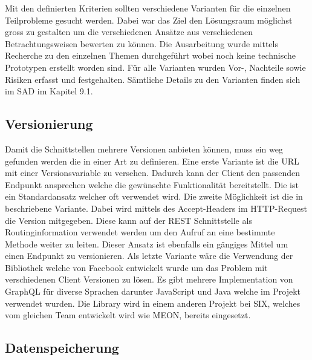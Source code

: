 Mit den definierten Kriterien sollten verschiedene Varianten für die einzelnen Teilprobleme gesucht werden. Dabei war das Ziel den Lösungsraum möglichst gross zu gestalten um die verschiedenen Ansätze aus verschiedenen Betrachtungsweisen bewerten zu können. Die Ausarbeitung wurde mittels Recherche zu den einzelnen Themen durchgeführt wobei noch keine technische Prototypen erstellt worden sind. Für alle Varianten wurden Vor-, Nachteile sowie Risiken erfasst und festgehalten. Sämtliche Details zu den Varianten finden sich im SAD im Kapitel 9.1.

\subsection{Versionierung}

Damit die Schnittstellen mehrere Versionen anbieten können, muss ein weg gefunden werden die in einer Art zu definieren. \newline Eine erste Variante ist die URL mit einer Versionsvariable zu versehen. Dadurch kann der Client den passenden Endpunkt ansprechen welche die gewünschte Funktionalität bereitstellt. Die ist ein Standardansatz welcher oft verwendet wird.\newline
Die zweite Möglichkeit ist die in \cite{contneg} beschriebene Variante. Dabei wird mittels des Accept-Headers im HTTP-Request die Version mitgegeben. Diese kann auf der REST Schnittstelle als Routinginformation verwendet werden um den Aufruf an eine bestimmte Methode weiter zu leiten. Dieser Ansatz ist ebenfalls ein gängiges Mittel um einen Endpunkt zu versionieren.\newline
Als letzte Variante wäre die Verwendung der \cite{gq} Bibliothek welche von Facebook entwickelt wurde um das Problem mit verschiedenen Client Versionen zu lösen. Es gibt mehrere Implementation von GraphQL für diverse Sprachen darunter JavaScript und Java welche im Projekt verwendet wurden. Die Library wird in einem anderen Projekt bei SIX, welches vom gleichen Team entwickelt wird wie MEON, bereits eingesetzt.

\subsection{Datenspeicherung}

